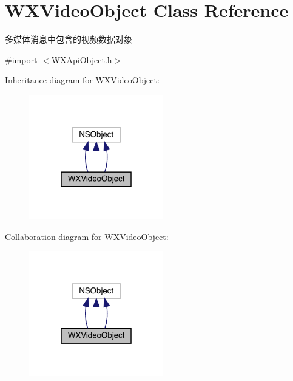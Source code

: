 \hypertarget{interface_w_x_video_object}{}\section{W\+X\+Video\+Object Class Reference}
\label{interface_w_x_video_object}


多媒体消息中包含的视频数据对象  




{\ttfamily \#import $<$W\+X\+Api\+Object.\+h$>$}



Inheritance diagram for W\+X\+Video\+Object\+:\nopagebreak
\begin{figure}[H]
\begin{center}
\leavevmode
\includegraphics[width=166pt]{interface_w_x_video_object__inherit__graph}
\end{center}
\end{figure}


Collaboration diagram for W\+X\+Video\+Object\+:\nopagebreak
\begin{figure}[H]
\begin{center}
\leavevmode
\includegraphics[width=166pt]{interface_w_x_video_object__coll__graph}
\end{center}
\end{figure}
